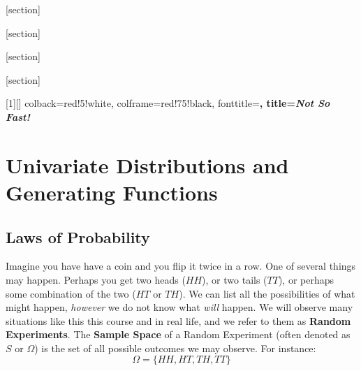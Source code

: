 \documentclass{report}
\begin{document}
\setlength\parindent{0pt}

\newcommand{\todo}{TODO\quad}

[section]

[section]

[section]

[section]

[1][]{
    colback=red!5!white,
    colframe=red!75!black,
    fonttitle=\bfseries,
    title=\emph{Not So Fast!}
}


\tableofcontents

\chapter{Univariate Distributions and Generating Functions}

\section{Laws of Probability}
Imagine you have have a coin and you flip it twice in a row. One of several things may happen. Perhaps you get two heads ($HH$), or two tails ($TT$), or perhaps some combination of the two ($HT$ or $TH$). We can list all the possibilities of what might happen, \emph{however} we do not know what \emph{will} happen. We will observe many situations like this this course and in real life, and we refer to them as \textbf{Random Experiments}. The \textbf{Sample Space} of a Random Experiment (often denoted as $S$ or $\Omega$) is the set of all possible outcomes we may observe. For instance:
\[
    \Omega=\{HH,HT,TH,TT\}
\]
\end{document}
